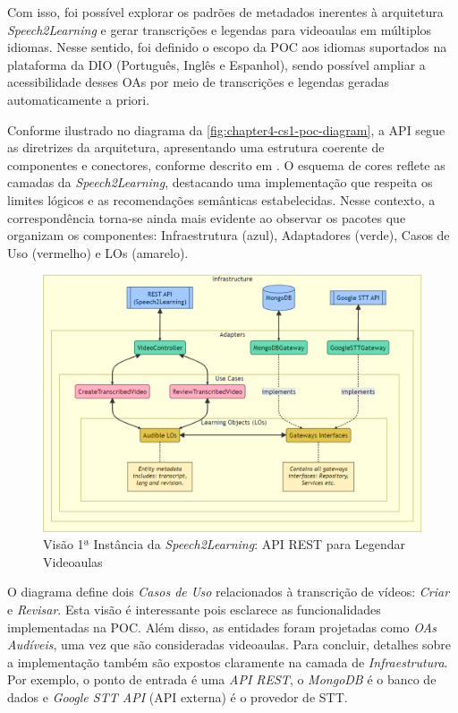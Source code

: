 Com isso, foi possível explorar os padrões de metadados inerentes à arquitetura \textit{Speech2Learning} e gerar transcrições e legendas para videoaulas em múltiplos idiomas. Nesse sentido, foi definido o escopo da POC aos idiomas suportados na plataforma da DIO (Português, Inglês e Espanhol), sendo possível ampliar a acessibilidade desses OAs por meio de transcrições e legendas geradas automaticamente a priori.

Conforme ilustrado no diagrama da \autoref{fig:chapter4-cs1-poc-diagram}, a API segue as diretrizes da arquitetura, apresentando uma estrutura coerente de componentes e conectores, conforme descrito em . O esquema de cores reflete as camadas da \textit{Speech2Learning}, destacando uma implementação que respeita os limites lógicos e as recomendações semânticas estabelecidas. Nesse contexto, a correspondência torna-se ainda mais evidente ao observar os pacotes que organizam os componentes: Infraestrutura (azul), Adaptadores (verde), Casos de Uso (vermelho) e LOs (amarelo).

\begin{figure}[htb]
\centering
\caption{Visão 1ª Instância da \textit{Speech2Learning}: API REST para Legendar Videoaulas}
\label{fig:chapter4-cs1-poc-diagram}
\includegraphics[width=\columnwidth]{images/chapter4-cs1-poc-diagram.png}
\end{figure}

O diagrama define dois \textit{Casos de Uso} relacionados à transcrição de vídeos: \textit{Criar} e \textit{Revisar}. Esta visão é interessante pois esclarece as funcionalidades implementadas na POC. Além disso, as entidades foram projetadas como \textit{OAs Audíveis}, uma vez que são consideradas videoaulas. Para concluir, detalhes sobre a implementação também são expostos claramente na camada de \textit{Infraestrutura}. Por exemplo, o ponto de entrada é uma \textit{API REST}, o \textit{MongoDB} é o banco de dados e \textit{Google STT API} (API externa) é o provedor de STT.

